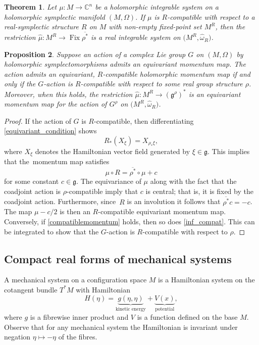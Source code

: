 \documentclass[pdftex]{sigma}
\numberwithin{equation}{section}
\newtheorem{Theorem}{Theorem}[section]
\newtheorem{Proposition}[Theorem]{Proposition}
 { \theoremstyle{definition}
\newtheorem{Definition}[Theorem]{Definition}
\newtheorem{Note}[Theorem]{Note}
\newtheorem{Example}[Theorem]{Example}
\newtheorem{Remark}[Theorem]{Remark} }
\DeclareMathOperator{\fix}{Fix}
\newcommand{\C}{\mathbb{C}}
\begin{document}
\begin{Theorem}\label{real_int_system}
	Let $\mu\colon M\rightarrow\C^n$ be a holomorphic integrable system on a holomorphic symplectic manifold $(M,\Omega)$. If $\mu$ is $R$-compatible with respect to a real-symplectic structure $R$ on $M$ with non-empty fixed-point set $M^R$, then the restriction $\widehat{\mu}\colon M^R\rightarrow\fix\overline{\rho^*}$ is a real integrable system on $\bigl(M^R,\widehat{\omega}_R\bigr)$.
\end{Theorem}

\begin{Proposition}\label{real_momentum}
	Suppose an action of a complex Lie group $G$ on $(M,\Omega)$ by holomorphic symplectomorphisms admits an equivariant momentum map. The action admits an equivariant, $R$-compatible holomorphic momentum map if and only if the $G$-action is $R$-compatible with respect to some real group structure $\rho$. Moreover, when this holds, the restriction $\widehat{\mu}\colon M^R\rightarrow(\mathfrak{g}^\rho)^*$ is an equivariant momentum map for the action of $G^\rho$ on $\bigl(M^R,\widehat{\omega}_R\bigr)$.
\end{Proposition}
\begin{proof}
	If the action of $G$ is $R$-compatible, then differentiating \eqref{equivariant_condition} shows
	\begin{equation}\label{inf_compat}
		R_*(X_\xi)=X_{\rho_*\xi},
	\end{equation}
	where $X_\xi$ denotes the Hamiltonian vector field generated by $\xi\in\mathfrak{g}$. This implies that the~momentum map satisfies
	\[
	{\mu\circ R}=\overline{\rho^*}\circ\mu+c
	\]
	for some constant $c\in\mathfrak{g}$. The equivariance of $\mu$ along with the fact that the coadjoint action is $\rho$-compatible imply that $c$ is central; that is, it is fixed by the coadjoint action. Furthermore, since~$R$ is an involution it follows that $\overline{\rho^*}c=-c$. The map $\mu-c/2$ is then an $R$-compatible equivariant momentum map. Conversely, if \eqref{compatiblemomentum} holds, then so does \eqref{inf_compat}. This can be integrated to show that the $G$-action is $R$-compatible with respect to $\rho$.
\end{proof}

\subsection{Compact real forms of mechanical systems}
	
	A mechanical system on a configuration space $M$ is a Hamiltonian system on the cotangent bundle $T^*M$ with Hamiltonian
	\[
	H(\eta)=\underbrace{g(\eta,\eta)}_\text{kinetic energy}+\underbrace{V(x)}_\text{potential},
	\]
	where $g$ is a fibrewise inner product and $V$ is a function defined on the base $M$. Observe that for any mechanical system the Hamiltonian is invariant under negation $\eta\mapsto-\eta$ of the fibres.
	
\end{document}
